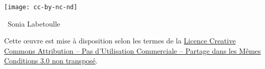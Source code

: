 \noi\texttt{[image: cc-by-nc-nd]}

\noi\textcopyright~Sonia Labetoulle

\noi Cette \oe{}uvre est mise à disposition selon les termes de la 
\href{http://creativecommons.org/licenses/by-nc-sa/3.0/}{Licence 
Creative Commons Attribution -- Pas d’Utilisation Commerciale -- 
Partage dans les Mêmes Conditions 3.0 non transposé}.